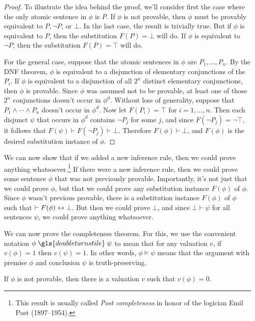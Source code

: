 \begin{proof} To illustrate the idea behind the proof, we'll consider
  first the case where the only atomic sentence in $\phi$ is $P$.  If
  $\phi$ is not provable, then $\phi$ must be provably equivalent to
  $P,\neg P$, or $\bot$.  In the last case, the result is trivially
  true.  But if $\phi$ is equivalent to $P$, then the substitution
  $F(P)=\bot$ will do.  If $\phi$ is equivalent to $\neg P$, then the
  substitution $F(P)=\top$ will do.

  For the general case, suppose that the atomic sentences in $\phi$
  are $P_1,\dots ,P_n$.  By the DNF theorem, $\phi$ is equivalent to a
  disjunction of elementary conjunctions of the $P_i$.  If $\phi$ is
  equivalent to a disjunction of all $2^n$ distinct elementary
  conjunctions, then $\phi$ is provable.  Since $\phi$ was assumed not
  to be provable, at least one of those $2^n$ conjunctions doesn't
  occur in $\phi ^d$.  Without loss of generality, suppose that
  $P_1\wedge\cdots\wedge P_n$ doesn't occur in $\phi ^d$.  Now let
  $F(P_i)=\top$ for $i=1,\dots ,n$.  Then each disjunct $\psi$ that
  occurs in $\phi ^d$ contains $\neg P_j$ for some $j$, and since
  $F(\neg P_j)=\neg\top$, it follows that
  $F(\psi )\vdash F(\neg P_j)\vdash\bot$.  Therefore
  $F(\phi )\vdash\bot$, and $F(\phi )$ is the desired substitution
  instance of $\phi$.
\end{proof}

We can now show that if we added a new inference rule, then we could
prove anything whatsoever.\footnote{This result is usually called
  \emph{Post completeness} in honor of the logician Emil Post
  (1897--1954).}  If there were a new inference rule, then we could
prove some sentence $\phi$ that was not previously provable.
Importantly, it's not just that we could prove $\phi$, but that we
could prove any substitution instance $F(\phi )$ of $\phi$.  Since
$\phi$ wasn't previous provable, there is a substitution instance
$F(\phi )$ of $\phi$ such that $\vdash F(\phi )\leftrightarrow \bot$.  But then
we could prove $\bot$, and since $\bot\vdash\psi$ for all sentences
$\psi$, we could prove anything whatsoever.

We can now prove the completeness theorem.  For this, we use the
convenient notation $\phi\;\gls{double turnstile}\;\psi$ to mean that for any valuation
$v$, if $v(\phi )=1$ then $v(\psi )=1$.  In other words,
$\phi\vDash\psi$ means that the argument with premise $\phi$ and
conclusion $\psi$ is truth-preserving.

\begin{lemma*} If $\phi$ is not provable, then there is a valuation
  $v$ such that \mbox{$v(\phi )=0$}. \end{lemma*}

